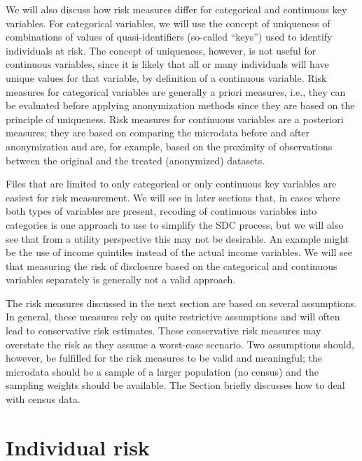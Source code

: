 \documentclass[letterpaper,10pt,english]{sphinxmanual}
\begin{document}
We will also discuss how risk measures differ for categorical and
continuous key variables. For categorical variables, we will use the
concept of uniqueness of combinations of values of quasi-identifiers
(so-called “keys”) used to identify individuals at risk. The concept of
uniqueness, however, is not useful for continuous variables, since it is
likely that all or many individuals will have unique values for that
variable, by definition of a continuous variable. Risk measures for
categorical variables are generally a priori measures, i.e., they can be
evaluated before applying anonymization methods since they are based on
the principle of uniqueness. Risk measures for continuous variables are
a posteriori measures; they are based on comparing the microdata before
and after anonymization and are, for example, based on the proximity of
observations between the original and the treated (anonymized) datasets.

Files that are limited to only categorical or only continuous key
variables are easiest for risk measurement. We will see in later
sections that, in cases where both types of variables are present,
recoding of continuous variables into categories is one approach to use
to simplify the SDC process, but we will also see that from a utility
perspective this may not be desirable. An example might be the use of
income quintiles instead of the actual income variables. We will see
that measuring the risk of disclosure based on the categorical and
continuous variables separately is generally not a valid approach.

The risk measures discussed in the next section are based on several
assumptions. In general, these measures rely on quite restrictive
assumptions and will often lead to conservative risk estimates. These
conservative risk measures may overstate the risk as they assume a
worst-case scenario. Two assumptions should, however, be fulfilled for
the risk measures to be valid and meaningful; the microdata should be a
sample of a larger population (no census) and the sampling weights
should be available. The Section
briefly discusses how to deal with census data.


\section{Individual risk}
\label{\detokenize{measure_risk:individual-risk}}
\end{document}
